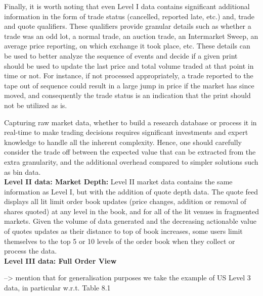 Finally, it is worth noting that even Level I data contains significant additional information in the form of trade status (cancelled, reported late, etc.) and, trade and quote qualifiers. These qualifiers provide granular details such as whether a trade was an odd lot, a normal trade, an auction trade, an Intermarket Sweep, an average price reporting, on which exchange it took place, etc. These details can be used to better analyze the sequence of events and decide if a given print should be used to update the last price and total volume traded at that point in time or not. For instance, if not processed appropriately, a trade reported to the tape out of sequence could result in a large jump in price if the market has since moved, and consequently the trade status is an indication that the print should not be utilized as is.

Capturing raw market data, whether to build a research database or process it in real-time to make trading decisions requires significant investments and expert knowledge to handle all the inherent complexity. Hence, one should carefully consider the trade off between the expected value that can be extracted from the extra granularity, and the additional overhead compared to simpler solutions such as bin data.\\

\noindent\textbf{Level II data: Market Depth:}  Level II market data contains the same information as Level I, but with the addition of quote depth data. The quote feed displays all lit limit order book updates (price changes, addition or removal of shares quoted) at any level in the book, and for all of the lit venues in fragmented markets. Given the volume of data generated and the decreasing actionable value of quotes updates as their distance to top of book increases, some users limit themselves to the top 5 or 10 levels of the order book  when they collect or process the data.\\


\noindent\textbf{Level III data: Full Order View} 

--> mention that for generalisation purposes we take the example of US Level 3 data, in particular w.r.t. Table 8.1  \\

